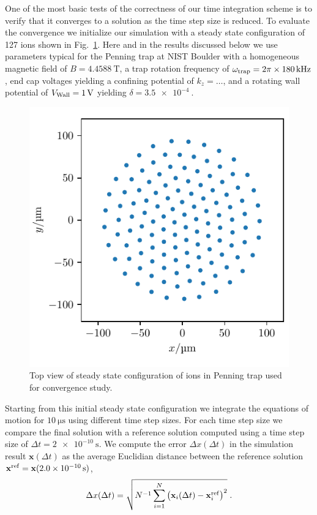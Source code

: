 \documentclass[aps, pra, preprint]{revtex4-1}
\begin{document}
One of the most basic tests of the correctness of our time
integration scheme is to verify that it converges to a solution
as the time step size is reduced. To evaluate the convergence we
initialize our simulation with a steady state configuration of
127 ions shown in Fig.~\ref{fig:initial_state_top_view}. Here and
in the results discussed below we use parameters typical for the
Penning trap at NIST Boulder with a homogeneous magnetic field of
$B=\SI{4.4588}{\tesla}$,
a trap rotation frequency of $\omega_{\rm trap}=2\pi\times
\SI{180}{\kilo \hertz}$, end cap voltages yielding a confining
potential of $k_z=\ldots$, and a
rotating wall potential of $V_{\rm Wall} = \SI{1}{\volt}$
yielding $\delta=\SI{3.5e-4}{}$.
\begin{figure}
  \includegraphics{./figures/fig_initial_state_top_view.pdf}
  \caption{Top view of steady state configuration of ions in
    Penning trap used for convergence study.}
  \label{fig:initial_state_top_view}
\end{figure}

Starting from this initial steady state configuration we
integrate the equations of motion for $\SI{10}{\us}$ using
different time step sizes. For each time step size we compare the
final solution with a reference solution computed using a time
step size of $\Delta t = \SI{2e-10}{\second}$. We compute the
error $\Delta x(\Delta t)$ in the simulation result
$\mathbf{x}(\Delta t)$ as the average Euclidian distance between
the reference solution $\mathbf{x}^{\rm
  ref}=\mathbf{x}(\SI{2.0e-10}{\second})$,
\begin{equation}
  \Delta x(\Delta t) =
  \sqrt{N^{-1}\sum_{i=1}^N\left(
      \mathbf{x}_i(\Delta t)-\mathbf{x}_i^{\rm ref}\right)^2}\;.
\end{equation}
\end{document}
